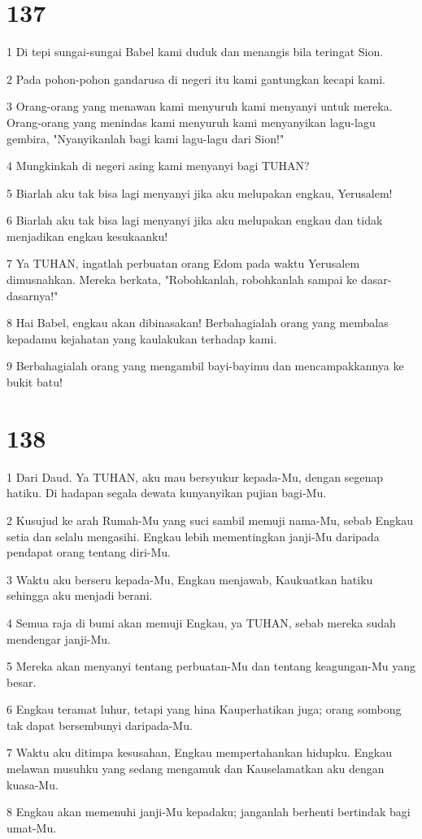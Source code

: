 \chapter{137}

\par 1 Di tepi sungai-sungai Babel kami duduk dan menangis bila teringat Sion.
\par 2 Pada pohon-pohon gandarusa di negeri itu kami gantungkan kecapi kami.
\par 3 Orang-orang yang menawan kami menyuruh kami menyanyi untuk mereka. Orang-orang yang menindas kami menyuruh kami menyanyikan lagu-lagu gembira, "Nyanyikanlah bagi kami lagu-lagu dari Sion!"
\par 4 Mungkinkah di negeri asing kami menyanyi bagi TUHAN?
\par 5 Biarlah aku tak bisa lagi menyanyi jika aku melupakan engkau, Yerusalem!
\par 6 Biarlah aku tak bisa lagi menyanyi jika aku melupakan engkau dan tidak menjadikan engkau kesukaanku!
\par 7 Ya TUHAN, ingatlah perbuatan orang Edom pada waktu Yerusalem dimusnahkan. Mereka berkata, "Robohkanlah, robohkanlah sampai ke dasar-dasarnya!"
\par 8 Hai Babel, engkau akan dibinasakan! Berbahagialah orang yang membalas kepadamu kejahatan yang kaulakukan terhadap kami.
\par 9 Berbahagialah orang yang mengambil bayi-bayimu dan mencampakkannya ke bukit batu!

\chapter{138}

\par 1 Dari Daud. Ya TUHAN, aku mau bersyukur kepada-Mu, dengan segenap hatiku. Di hadapan segala dewata kunyanyikan pujian bagi-Mu.
\par 2 Kusujud ke arah Rumah-Mu yang suci sambil memuji nama-Mu, sebab Engkau setia dan selalu mengasihi. Engkau lebih mementingkan janji-Mu daripada pendapat orang tentang diri-Mu.
\par 3 Waktu aku berseru kepada-Mu, Engkau menjawab, Kaukuatkan hatiku sehingga aku menjadi berani.
\par 4 Semua raja di bumi akan memuji Engkau, ya TUHAN, sebab mereka sudah mendengar janji-Mu.
\par 5 Mereka akan menyanyi tentang perbuatan-Mu dan tentang keagungan-Mu yang besar.
\par 6 Engkau teramat luhur, tetapi yang hina Kauperhatikan juga; orang sombong tak dapat bersembunyi daripada-Mu.
\par 7 Waktu aku ditimpa kesusahan, Engkau mempertahankan hidupku. Engkau melawan musuhku yang sedang mengamuk dan Kauselamatkan aku dengan kuasa-Mu.
\par 8 Engkau akan memenuhi janji-Mu kepadaku; janganlah berhenti bertindak bagi umat-Mu.

